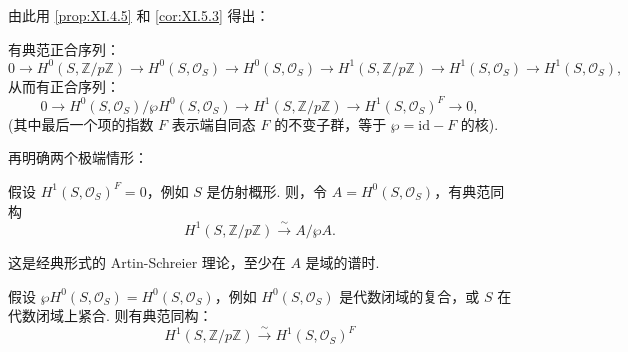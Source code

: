 由此用 \ref{prop:XI.4.5} 和 \ref{cor:XI.5.3} 得出：

\begin{proposition}\label{prop:XI.6.8}
有典范正合序列：
\[
0 \longrightarrow H^0(S, \mathbb{Z}/p\mathbb{Z}) \longrightarrow H^0(S, \mathcal{O}_S) \longrightarrow H^0(S, \mathcal{O}_S) \longrightarrow H^1(S, \mathbb{Z}/p\mathbb{Z}) \longrightarrow H^1(S, \mathcal{O}_S) \longrightarrow H^1(S, \mathcal{O}_S),
\]
从而有正合序列：
\[
0 \longrightarrow H^0(S, \mathcal{O}_S)/\wp H^0(S, \mathcal{O}_S) \longrightarrow H^1(S, \mathbb{Z}/p\mathbb{Z}) \longrightarrow H^1(S, \mathcal{O}_S)^F \longrightarrow 0,
\]
(其中最后一个项的指数 $F$ 表示端自同态 $F$ 的不变子群，等于 $\wp = \mathrm{id} - F$ 的核).
\end{proposition}

再明确两个极端情形：

\begin{corollary}\label{cor:XI.6.9}
假设 $H^1(S, \mathcal{O}_S)^F = 0$，例如 $S$ 是仿射概形. 则，令 $A = H^0(S, \mathcal{O}_S)$，有典范同构
\[
H^1(S, \mathbb{Z}/p\mathbb{Z}) \xrightarrow{\sim} A/\wp A.
\]
\end{corollary}

这是经典形式的 Artin-Schreier 理论，至少在 $A$ 是域的谱时.

\begin{corollary}\label{cor:XI.6.10}
假设 $\wp H^0(S, \mathcal{O}_S) = H^0(S, \mathcal{O}_S)$，例如 $H^0(S, \mathcal{O}_S)$ 是代数闭域的复合，或 $S$ 在代数闭域上紧合. 则有典范同构：
\[
H^1(S, \mathbb{Z}/p\mathbb{Z}) \xrightarrow{\sim} H^1(S, \mathcal{O}_S)^F
\]
\end{corollary}

